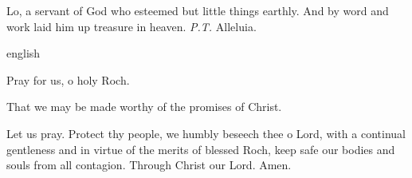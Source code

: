 \begin{enpars} \noindent Lo, a servant of God who esteemed but little things earthly. And by word and work laid him up treasure in heaven. \textit{P.T. }Alleluia. \end{enpars}

{english}{\noindent \vv Pray for us, o holy Roch.

\noindent \rr That we may be made worthy of the promises of Christ.

\noindent Let us pray. Protect thy people, we humbly beseech thee o Lord, with a continual gentleness and in virtue of the merits of blessed Roch, keep safe our bodies and souls from all contagion. Through Christ our Lord. Amen.}



